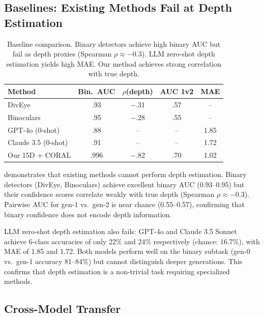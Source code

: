 \documentclass[11pt,a4paper]{article}
\begin{document}
\subsection{Baselines: Existing Methods Fail at Depth Estimation}

\begin{table}[t]
\centering
\small
\begin{tabular}{lcccc}
\toprule
\textbf{Method} & \textbf{Bin.\ AUC} & \textbf{$\rho$(depth)} & \textbf{AUC 1v2} & \textbf{MAE} \\
\midrule
DivEye & .93 & $-$.31 & .57 & -- \\
Binoculars & .95 & $-$.28 & .55 & -- \\
GPT-4o (0-shot) & .88 & -- & -- & 1.85 \\
Claude 3.5 (0-shot) & .91 & -- & -- & 1.72 \\
Our 15D + CORAL & .996 & $-$.82 & .70 & 1.02 \\
\bottomrule
\end{tabular}
\caption{Baseline comparison. Binary detectors achieve high binary AUC but fail as depth proxies (Spearman $\rho \approx -0.3$). LLM zero-shot depth estimation yields high MAE. Our method achieves strong correlation with true depth.}
\label{tab:baselines}
\end{table}

 demonstrates that existing methods cannot perform depth estimation. Binary detectors (DivEye, Binoculars) achieve excellent binary AUC (0.93--0.95) but their confidence scores correlate weakly with true depth (Spearman $\rho \approx -0.3$). Pairwise AUC for gen-1 vs.\ gen-2 is near chance (0.55--0.57), confirming that binary confidence does not encode depth information.

LLM zero-shot depth estimation also fails: GPT-4o and Claude 3.5 Sonnet achieve 6-class accuracies of only 22\% and 24\% respectively (chance: 16.7\%), with MAE of 1.85 and 1.72. Both models perform well on the binary subtask (gen-0 vs.\ gen-1 accuracy 81--84\%) but cannot distinguish deeper generations. This confirms that depth estimation is a non-trivial task requiring specialized methods.

\subsection{Cross-Model Transfer}
\end{document}
